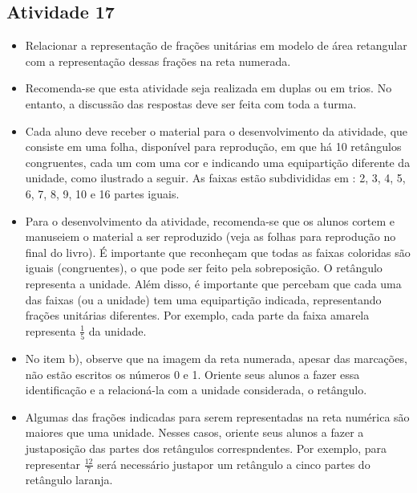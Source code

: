 \begin{multicols}{2}
\subsection{Atividade 17}

\begin{itemize} %
    \item       Relacionar a representação de frações unitárias em modelo de área retangular com a representação dessas frações na reta numerada. 
\end{itemize} %
    
\begin{itemize} %
    \item       Recomenda-se que esta atividade seja realizada em duplas ou em trios. No entanto, a discussão das respostas deve ser feita com toda a turma.
    \item       Cada aluno deve receber o material para o desenvolvimento da atividade, que consiste em uma folha, disponível para reprodução, em que há 10 retângulos congruentes, cada um com uma cor e indicando uma equipartição diferente da unidade, como ilustrado a seguir. As faixas estão subdivididas em : 2, 3, 4, 5, 6, 7, 8, 9, 10 e 16 partes iguais. 
    \item       Para o desenvolvimento da atividade, recomenda-se que os alunos cortem e manuseiem o material a ser reproduzido (veja as folhas para reprodução no final do livro). É importante que reconheçam que todas as faixas coloridas são iguais (congruentes), o que pode ser feito pela sobreposição. O retângulo representa a unidade. Além disso, é importante que percebam que cada uma das faixas (ou a unidade) tem uma equipartição indicada, representando frações unitárias diferentes. Por exemplo, cada parte da faixa amarela representa       $\frac{1}{5}$       da unidade.
    \item       No item b), observe que na imagem da reta numerada, apesar das marcações, não estão escritos os números 0 e 1. Oriente seus alunos a fazer essa identificação e a relacioná-la com a unidade considerada, o retângulo.
    \item       Algumas das frações indicadas para serem representadas na reta numérica são maiores que uma unidade. Nesses casos, oriente seus alunos a fazer a justaposição das partes dos retângulos correspndentes. Por exemplo, para representar       $\frac{12}{7}$       será necessário justapor um retângulo a cinco partes do retângulo laranja.
\end{itemize} %


\end{multicols}
